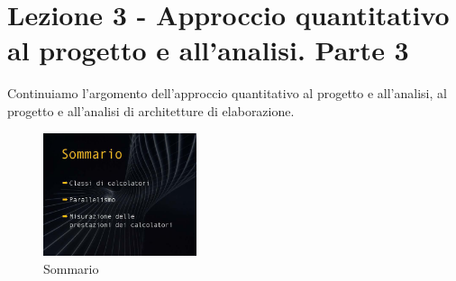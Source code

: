 \chapter{Lezione 3 - Approccio quantitativo al progetto e all'analisi. Parte 3}

Continuiamo l'argomento dell'approccio quantitativo al progetto e all'analisi, al progetto e all'analisi di architetture di elaborazione.

\FloatBarrier
\begin{figure}[H]
  \centering
  \includegraphics[width=0.40\textwidth,
                    trim=40 80 10 40, %
                    clip]
                    {images/Lez03_p01_fig_02.png}
  \caption{Sommario}
  \label{fig:Lez03_p01_fig_02}
\end{figure}
\FloatBarrier
\noindent

